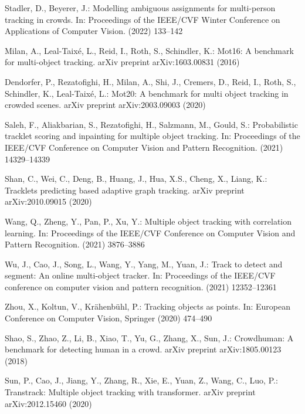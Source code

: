 \documentclass[runningheads]{llncs}
\begin{document}
\begin{thebibliography}{10}
Stadler, D., Beyerer, J.:
\newblock Modelling ambiguous assignments for multi-person tracking in crowds.
\newblock In: Proceedings of the IEEE/CVF Winter Conference on Applications of
  Computer Vision. (2022)  133--142

Milan, A., Leal-Taix{\'e}, L., Reid, I., Roth, S., Schindler, K.:
\newblock Mot16: A benchmark for multi-object tracking.
\newblock arXiv preprint arXiv:1603.00831 (2016)

Dendorfer, P., Rezatofighi, H., Milan, A., Shi, J., Cremers, D., Reid, I.,
  Roth, S., Schindler, K., Leal-Taix{\'e}, L.:
\newblock Mot20: A benchmark for multi object tracking in crowded scenes.
\newblock arXiv preprint arXiv:2003.09003 (2020)

Saleh, F., Aliakbarian, S., Rezatofighi, H., Salzmann, M., Gould, S.:
\newblock Probabilistic tracklet scoring and inpainting for multiple object
  tracking.
\newblock In: Proceedings of the IEEE/CVF Conference on Computer Vision and
  Pattern Recognition. (2021)  14329--14339

Shan, C., Wei, C., Deng, B., Huang, J., Hua, X.S., Cheng, X., Liang, K.:
\newblock Tracklets predicting based adaptive graph tracking.
\newblock arXiv preprint arXiv:2010.09015 (2020)

Wang, Q., Zheng, Y., Pan, P., Xu, Y.:
\newblock Multiple object tracking with correlation learning.
\newblock In: Proceedings of the IEEE/CVF Conference on Computer Vision and
  Pattern Recognition. (2021)  3876--3886

Wu, J., Cao, J., Song, L., Wang, Y., Yang, M., Yuan, J.:
\newblock Track to detect and segment: An online multi-object tracker.
\newblock In: Proceedings of the IEEE/CVF conference on computer vision and
  pattern recognition. (2021)  12352--12361

Zhou, X., Koltun, V., Kr{\"a}henb{\"u}hl, P.:
\newblock Tracking objects as points.
\newblock In: European Conference on Computer Vision, Springer (2020)  474--490

Shao, S., Zhao, Z., Li, B., Xiao, T., Yu, G., Zhang, X., Sun, J.:
\newblock Crowdhuman: A benchmark for detecting human in a crowd.
\newblock arXiv preprint arXiv:1805.00123 (2018)

Sun, P., Cao, J., Jiang, Y., Zhang, R., Xie, E., Yuan, Z., Wang, C., Luo, P.:
\newblock Transtrack: Multiple object tracking with transformer.
\newblock arXiv preprint arXiv:2012.15460 (2020)


\end{thebibliography}
\end{document}
